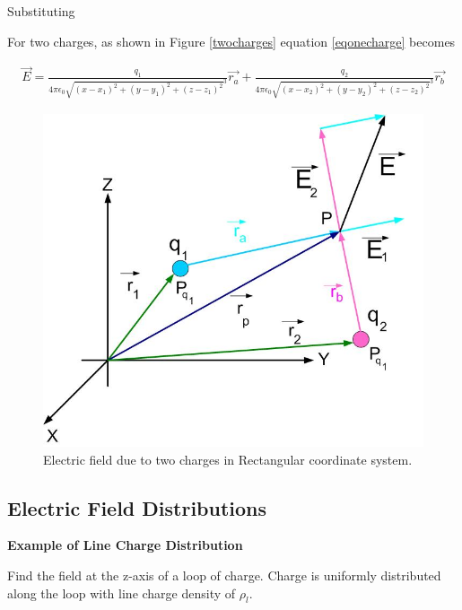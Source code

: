\documentclass{ximera}
\begin{document}
Substituting 


For two charges, as shown in Figure \ref{twocharges} equation \ref{eqonecharge} becomes

\begin{eqnarray}
\vec{E}= \frac{q_1}{4 \pi \epsilon_{0} {\sqrt{(x - x_1)^2 +(y - y_1)^2 +(z - z_1)^2}
}^3} \vec{r_a} + \frac{q_2}{4 \pi \epsilon_{0} {\sqrt{(x - x_2)^2 +(y - y_2)^2 +(z - z_2)^2}
}^3} \vec{r_b} 
\end{eqnarray}


\begin{figure}[htbp]
\begin{center}
\includegraphics[scale=0.5]{../jpg/twochargescartcoord.jpg}
\end{center}
\caption{Electric field due to two charges in  Rectangular coordinate system.}
\label{singlecharge}
\end{figure}









\subsection{Electric Field Distributions}

{\bf Example of Line Charge Distribution}

Find the field at the z-axis of a loop of charge. Charge is uniformly distributed along the loop with line charge density of $\rho_l$.
\end{document}
